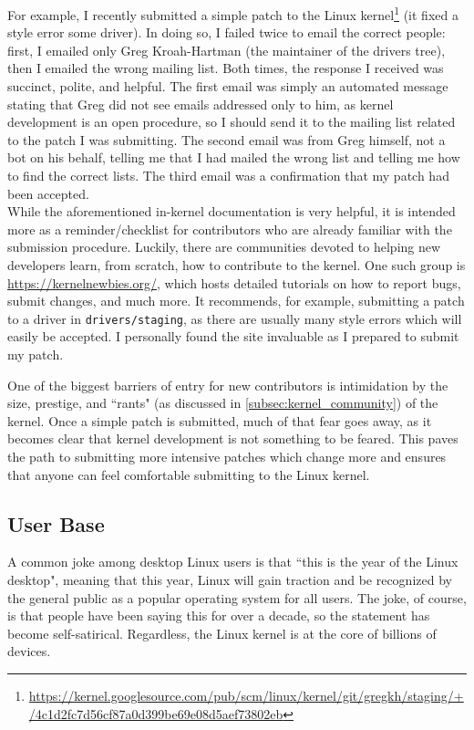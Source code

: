 \documentclass[11pt]{article}
\begin{document}
For example, I recently submitted a simple patch to the Linux kernel\footnote{\url{https://kernel.googlesource.com/pub/scm/linux/kernel/git/gregkh/staging/+/4c1d2fc7d56cf87a0d399be69e08d5aef73802eb}} (it fixed a style error some driver).  In doing so, I failed twice to email the correct people: first, I emailed only Greg Kroah-Hartman (the maintainer of the drivers tree), then I emailed the wrong mailing list.  Both times, the response I received was succinct, polite, and helpful.  The first email was simply an automated message stating that Greg did not see emails addressed only to him, as kernel development is an open procedure, so I should send it to the mailing list related to the patch I was submitting.  The second email was from Greg himself, not a bot on his behalf, telling me that I had mailed the wrong list and telling me how to find the correct lists.  The third email was a confirmation that my patch had been accepted.\\

While the aforementioned in-kernel documentation is very helpful, it is intended more as a reminder/checklist for contributors who are already familiar with the submission procedure.  Luckily, there are communities devoted to helping new developers learn, from scratch, how to contribute to the kernel.  One such group is \url{https://kernelnewbies.org/}, which hosts detailed tutorials on how to report bugs, submit changes, and much more.  It recommends, for example, submitting a patch to a driver in \texttt{drivers/staging}, as there are usually many style errors which will easily be accepted.  I personally found the site invaluable as I prepared to submit my patch.

One of the biggest barriers of entry for new contributors is intimidation by the size, prestige, and ``rants" (as discussed in \ref{subsec:kernel_community}) of the kernel.  Once a simple patch is submitted, much of that fear goes away, as it becomes clear that kernel development is not something to be feared.  This paves the path to submitting more intensive patches which change more and ensures that anyone can feel comfortable submitting to the Linux kernel.

\subsection{User Base}
\label{subsec:kernel_users}

A common joke among desktop Linux users is that ``this is the year of the Linux desktop", meaning that this year, Linux will gain traction and be recognized by the general public as a popular operating system for all users.  The joke, of course, is that people have been saying this for over a decade, so the statement has become self-satirical.  Regardless, the Linux kernel is at the core of billions of devices.
\end{document}
